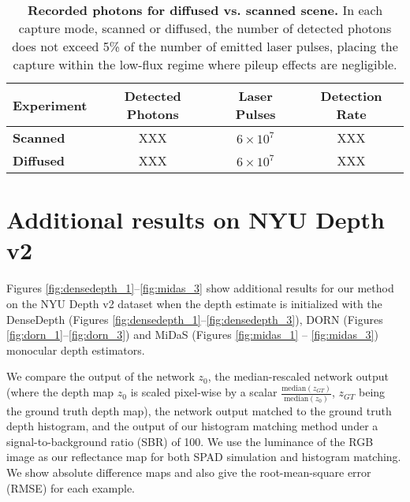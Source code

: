 \documentclass[runningheads]{llncs}
\begin{document}
\begin{table}[ht!]
    \renewcommand{\arraystretch}{1.3}
    \setlength{\tabcolsep}{10pt}
     \centering
     \begin{tabular}{lccc} \toprule
         \textbf{Experiment} & \textbf{Detected Photons} & \textbf{Laser Pulses} & \textbf{Detection Rate} \\\hline
         \textbf{Scanned} & XXX & $6\times10^7$ & XXX \\
         \textbf{Diffused} & XXX & $6\times10^7$ & XXX \\
        \bottomrule
    \end{tabular}
    \vspace{0.4em}
    \caption{\textbf{Recorded photons for diffused vs. scanned scene.} In each capture mode, scanned or diffused, the number of detected photons does not exceed 5\% of the number of emitted laser pulses, placing the capture within the low-flux regime where pileup effects are negligible.}
    \label{tab:photon_counts}
\end{table}

\section{Additional results on NYU Depth v2}
Figures \ref{fig:densedepth_1}--\ref{fig:midas_3} show additional results
for our method on the NYU Depth v2 dataset when the depth estimate is
initialized with the DenseDepth \cite{Alhashim2018} (Figures
\ref{fig:densedepth_1}--\ref{fig:densedepth_3}), DORN \cite{Fu2018} (Figures
\ref{fig:dorn_1}--\ref{fig:dorn_3}) 
and MiDaS \cite{Lasinger:2019} (Figures \ref{fig:midas_1} -- \ref{fig:midas_3}) monocular depth estimators.

We compare the output of the network $z_0$, the
median-rescaled network output (where the depth map $z_0$ is scaled pixel-wise by a
scalar $\frac{\text{median}(z_{GT})}{\text{median}(z_0)}$, $z_{GT}$ being the
ground truth depth map), the network output matched to the ground truth depth histogram, and the output of
our histogram matching method under a signal-to-background ratio (SBR) of 100.
We use the luminance of the RGB image as our reflectance map
for both SPAD simulation and histogram matching.
We show absolute difference maps and also give
the root-mean-square error (RMSE) for each example.

\end{document}
